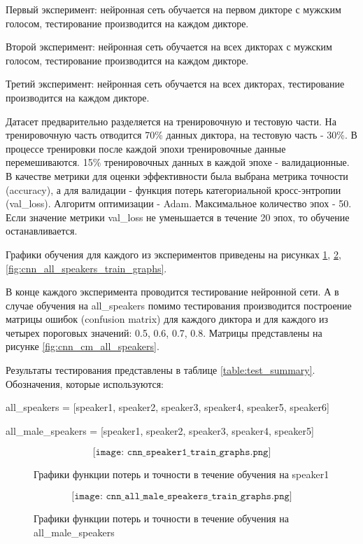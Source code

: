 Первый эксперимент: нейронная сеть обучается на первом дикторе с мужским голосом, тестирование производится на каждом дикторе. 

Второй эксперимент: нейронная сеть обучается на всех дикторах с мужским голосом, тестирование производится на каждом дикторе. 

Третий эксперимент: нейронная сеть обучается на всех дикторах, тестирование производится на каждом дикторе.

Датасет предварительно разделяется на тренировочную и тестовую части. На тренировочную часть отводится 70\% данных диктора, на тестовую часть - 30\%. В процессе тренировки после каждой эпохи тренировочные данные перемешиваются. 15\% тренировочных данных в каждой эпохе - валидационные. В качестве метрики для оценки эффективности была выбрана метрика точности (accuracy), а для валидации - функция потерь категориальной кросс-энтропии (val\_loss). Алгоритм оптимизации - Adam. Максимальное количество эпох - 50. Если значение метрики val\_loss не уменьшается в течение 20 эпох, то обучение останавливается.

Графики обучения для каждого из экспериментов приведены на рисунках \ref{fig:cnn_speaker1_train_graphs}, \ref{fig:cnn_all_male_speakers_train_graphs}, \ref{fig:cnn_all_speakers_train_graphs}.

В конце каждого эксперимента проводится тестирование нейронной сети.
А в случае обучения на all\_speakers помимо тестирования производится построение матрицы ошибок (confusion matrix) для каждого диктора и для каждого из четырех пороговых значений: 0.5, 0.6, 0.7, 0.8. Матрицы представлены на рисунке \ref{fig:cnn_cm_all_speakers}.

Результаты тестирования представлены в таблице \ref{table:test_summary}. Обозначения, которые используются:

all\_speakers = [speaker1, speaker2, speaker3, speaker4, speaker5, speaker6]

all\_male\_speakers = [speaker1, speaker2, speaker3, speaker4, speaker5]

\begin{figure}[H]
  \[\texttt{[image: cnn\_speaker1\_train\_graphs.png]}\]
  \caption{Графики функции потерь и точности в течение обучения на speaker1}
  \label{fig:cnn_speaker1_train_graphs}
\end{figure}

\begin{figure}[H]
  \[\texttt{[image: cnn\_all\_male\_speakers\_train\_graphs.png]}\]
  \caption{Графики функции потерь и точности в течение обучения на all\_male\_speakers}
  \label{fig:cnn_all_male_speakers_train_graphs}
\end{figure}

